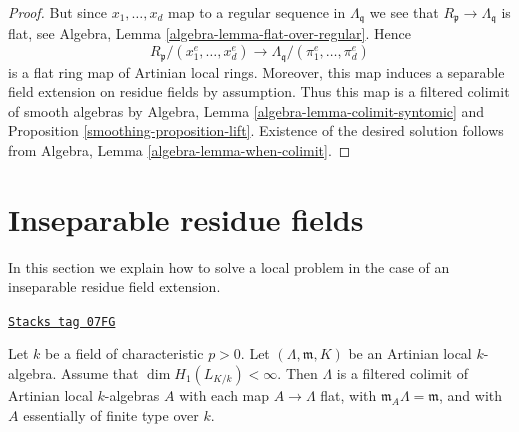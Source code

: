 \begin{proof}
But since $x_1, \ldots, x_d$ map to a regular sequence
in $\Lambda_\mathfrak q$ we see that $R_\mathfrak p \to \Lambda_\mathfrak q$
is flat, see Algebra, Lemma \ref{algebra-lemma-flat-over-regular}. Hence
$$
R_\mathfrak p/(x_1^e, \ldots, x_d^e) \to
\Lambda_\mathfrak q/(\pi_1^e, \ldots, \pi_d^e)
$$
is a flat ring map of Artinian local rings.
Moreover, this map induces a separable field extension
on residue fields by assumption. Thus this map is a filtered colimit
of smooth algebras by
Algebra, Lemma \ref{algebra-lemma-colimit-syntomic}
and Proposition \ref{smoothing-proposition-lift}.
Existence of the desired solution follows from
Algebra, Lemma \ref{algebra-lemma-when-colimit}.
\end{proof}

\section{Inseparable residue fields}
\label{smoothing-section-inseparable}
In this section we explain how to solve a local problem in the case
of an inseparable residue field extension.

\begin{lemma}[Helper]
\label{smoothing-lemma-helper}
\href{https://stacks.math.columbia.edu/tag/07FG}{\texttt{Stacks tag 07FG}}

Let $k$ be a field of characteristic $p > 0$.
Let $(\Lambda, \mathfrak m, K)$ be an Artinian local $k$-algebra.
Assume that $\dim H_1(L_{K/k}) < \infty$.
Then $\Lambda$ is a filtered colimit of Artinian
local $k$-algebras $A$ with each map $A \to \Lambda$ flat, with
$\mathfrak m_A \Lambda = \mathfrak m$, and with
$A$ essentially of finite type over $k$.
\end{lemma}

